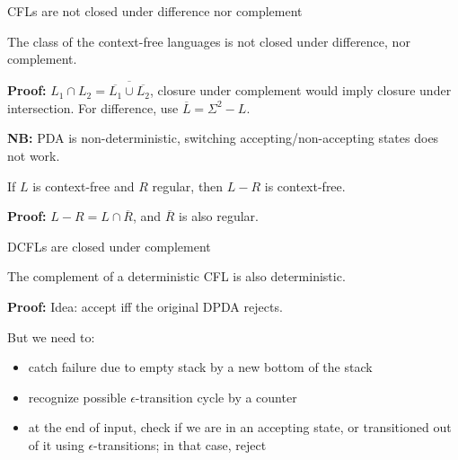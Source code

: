 \documentclass[handout]{beamer}
\begin{document}
\begin{frame}{CFLs are not closed under difference nor complement}

    \begin{theorem}
        The class of the context-free languages is not closed under difference, nor complement.
    \end{theorem}

    \textbf{Proof:} $L_1\cap L_2=\overline{\overline{L_1}\cup\overline{L_2}}$, closure under complement would imply closure under intersection. For difference, use $\overline{L}=\Sigma^2-L$.\hfill\qedsymbol

    \textbf{NB:} PDA is non-deterministic, switching accepting/non-accepting states does not work.

    \medskip

    \begin{proposition}
        If $L$ is context-free and $R$ regular, then $L-R$ is context-free.
    \end{proposition}

    \textbf{Proof:} $L-R=L\cap\overline{R}$, and $\overline{R}$ is also regular.\hfill\qedsymbol 

\end{frame}


\begin{frame}{DCFLs are closed under complement}

    \begin{theorem}
        The complement of a deterministic CFL is also deterministic.
    \end{theorem}
    \textbf{Proof:} Idea: accept iff the original DPDA rejects. 

    But we need to:
    \begin{itemize}
        \item catch failure due to empty stack by a new bottom of the stack
        \item recognize possible $\epsilon$-transition cycle by a counter
        \item at the end of input, check if we are in an accepting state, or transitioned out of it using $\epsilon$-transitions; in that case, reject
    \end{itemize}
    \hfill\qedsymbol

\end{frame}
\end{document}

